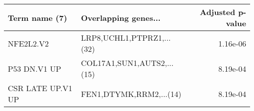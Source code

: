 \begin{tabular}{llr}
\toprule
    Term name (7) &       Overlapping genes... &  Adjusted p-value \\
\midrule
        NFE2L2.V2 &  LRP8,UCHL1,PTPRZ1,...(32) &          1.16e-06 \\
     P53 DN.V1 UP & COL17A1,SUN1,AUTS2,...(15) &          8.19e-04 \\
CSR LATE UP.V1 UP &    FEN1,DTYMK,RRM2,...(14) &          8.19e-04 \\
\bottomrule
\end{tabular}
